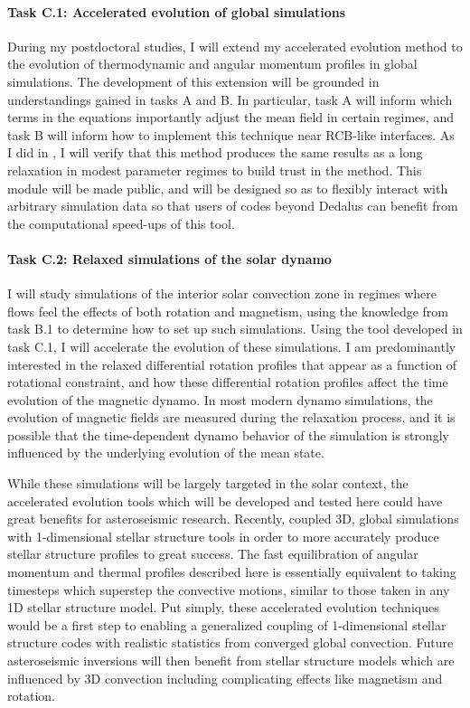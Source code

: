 \documentclass[11pt, preprint]{aastex}
\begin{document}
\paragraph{Task C.1: Accelerated evolution of global simulations}
\label{sct:taskC1}
During my postdoctoral studies, I will extend my accelerated evolution method to the evolution of thermodynamic and angular momentum profiles in global simulations.
The development of this extension will be grounded in understandings gained in tasks A and B.
In particular, task A will inform which terms in the equations importantly adjust the mean field in certain regimes, and task B will inform how to implement this technique near RCB-like interfaces.
As I did in \citet{anders&all2018}, I will verify that this method produces the same results as a long relaxation in modest parameter regimes to build trust in the method.
This module will be made public, and will be designed so as to flexibly interact with arbitrary simulation data so that users of codes beyond Dedalus can benefit from the computational speed-ups of this tool.

\vspace{-0.5cm}
\paragraph{Task C.2: Relaxed simulations of the solar dynamo}
\label{sct:taskC2}
I will study simulations of the interior solar convection zone in regimes where flows feel the effects of both rotation and magnetism, using the knowledge from task B.1 to determine how to set up such simulations.
Using the tool developed in task C.1, I will accelerate the evolution of these simulations.
I am predominantly interested in the relaxed differential rotation profiles that appear as a function of rotational constraint, and how these differential rotation profiles affect the time evolution of the magnetic dynamo.
In most modern dynamo simulations, the evolution of magnetic fields are measured during the relaxation process, and it is possible that the time-dependent dynamo behavior of the simulation is strongly influenced by the underlying evolution of the mean state.

While these simulations will be largely targeted in the solar context, the accelerated evolution tools which will be developed and tested here could have great benefits for asteroseismic research.
Recently, \citet{jorgensen&weiss2019} coupled 3D, global simulations with 1-dimensional stellar structure tools in order to more accurately produce stellar structure profiles to great success.
The fast equilibration of angular momentum and thermal profiles described here is essentially equivalent to taking timesteps which superstep the convective motions, similar to those taken in any 1D stellar structure model.
Put simply, these accelerated evolution techniques would be a first step to enabling a generalized coupling of 1-dimensional stellar structure codes with realistic statistics from converged global convection.
Future asteroseismic inversions will then benefit from stellar structure models which are influenced by 3D convection including complicating effects like magnetism and rotation.
\end{document}
